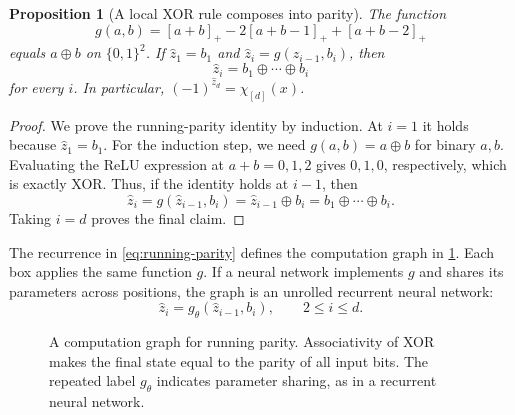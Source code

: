 \documentclass[11pt,twoside]{article}
\newtheorem{proposition}[theorem]{Proposition}
\theoremstyle{definition}
\theoremstyle{remark}
\begin{document}
\begin{proposition}[A local XOR rule composes into parity]
\label{prop:xor-compose}
The function
\[
g(a,b)=[a+b]_+-2[a+b-1]_++[a+b-2]_+
\]
equals $a\oplus b$ on $\{0,1\}^2$. If
$\widehat z_1=b_1$ and
$\widehat z_i=g(\widehat z_{i-1},b_i)$, then
\[
\widehat z_i=b_1\oplus\cdots\oplus b_i
\]
for every $i$. In particular,
$(-1)^{\widehat z_d}=\chi_{[d]}(x)$.
\end{proposition}

\begin{proof}
We prove the running-parity identity by induction. At $i=1$ it holds because
$\widehat z_1=b_1$. For the induction step, we need $g(a,b)=a\oplus b$
for binary $a,b$. Evaluating the ReLU expression at $a+b=0,1,2$ gives
$0,1,0$, respectively, which is exactly XOR. Thus, if the identity holds
at $i-1$, then
\[
\widehat z_i=g(\widehat z_{i-1},b_i)
=\widehat z_{i-1}\oplus b_i
=b_1\oplus\cdots\oplus b_i.
\]
Taking $i=d$ proves the final claim.
\end{proof}

The recurrence in \cref{eq:running-parity} defines the computation graph in
\cref{fig:running-parity-graph}. Each box applies the same function $g$. If a
neural network implements $g$ and shares its parameters across positions, the
graph is an unrolled recurrent neural network:
\[
\widehat z_i=g_\theta(\widehat z_{i-1},b_i),
\qquad 2\le i\le d.
\]

\begin{figure}[t]
\centering
{}
\caption{A computation graph for running parity. Associativity of XOR makes
the final state equal to the parity of all input bits. The repeated label
$g_\theta$ indicates parameter sharing, as in a recurrent neural network.}
\label{fig:running-parity-graph}
\end{figure}
\end{document}
